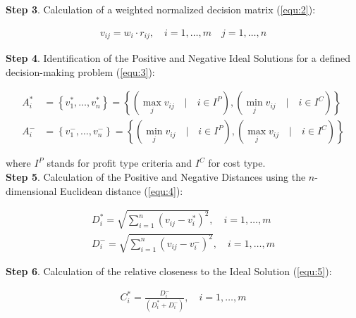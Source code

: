 \noindent \textbf{Step 3}. Calculation of a weighted normalized decision matrix (\ref{equ:2}):

\begin{equation}
\begin{array}{lcl}
v_{i j}=w_{i} \cdot r_{i j}, \quad i=1, \ldots, m \quad j=1, \ldots, n
\end{array}
\label{equ:2}
\end{equation}

\noindent \textbf{Step 4}. Identification of the Positive and Negative Ideal Solutions for a defined decision-making problem (\ref{equ:3}):

\begin{equation}
\begin{array}{lcl}
A_{i}^{*} &=\left\{v_{1}^{*}, \ldots, v_{n}^{*}\right\} =\left\{\left(\max _{j} v_{i j} \quad | \quad i \in I^{P}\right),\left(\min _{j} v_{i j} \quad | \quad i \in I^{C}\right)\right\} \\
A_{i}^{-} &=\left\{v_{1}^{-}, \ldots, v_{n}^{-}\right\} =\left\{\left(\min _{j} v_{i j} \quad | \quad i \in I^{P}\right),\left(\max _{j} v_{i j} \quad | \quad i \in I^{C}\right)\right\}
\end{array}
\label{equ:3}
\end{equation}

\noindent where $I^{P}$ stands for profit type criteria and $I^{C}$ for cost type. \\

\noindent \textbf{Step 5}. Calculation of the Positive and Negative Distances using the $n$-dimensional Euclidean distance (\ref{equ:4}):

\begin{equation}
\begin{array}{lcl}
D_{i}^{*}=\sqrt{\sum_{i=1}^{n}\left(v_{i j}-v_{i}^{*}\right)^{2}}, \quad i=1, \ldots, m \\
D_{i}^{-}=\sqrt{\sum_{i=1}^{n}\left(v_{i j}-v_{i}^{-}\right)^{2}}, \quad i=1, \ldots, m
\end{array}
\label{equ:4}
\end{equation}

\noindent \textbf{Step 6}. Calculation of the relative closeness to the Ideal Solution (\ref{equ:5}):

\begin{equation}
\begin{array}{lcl}
C_{i}^{*}=\frac{D_{i}^{-}}{\left(D_{i}^{*}+D_{i}^{-}\right)}, \quad i=1, \ldots, m
\end{array}
\label{equ:5}
\end{equation}

